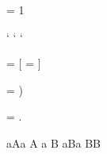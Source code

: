 \documentclass{article}
\makeatletter
\def\newXeTeXintercharclass{%
 \e@alloc\XeTeXcharclass
   \chardef\xe@alloc@intercharclass\m@ne\e@alloc@intercharclass@top}
\makeatother
\begin{document}
\XeTeXinterchartokenstate = 1

\newXeTeXintercharclass \mycharclassa
\newXeTeXintercharclass \mycharclassA
\newXeTeXintercharclass \mycharclassB

\XeTeXcharclass `\a \mycharclassa
\XeTeXcharclass `\A \mycharclassA
\XeTeXcharclass `\B \mycharclassB

\XeTeXinterchartoks \mycharclassa \mycharclassA = {[\itshape}
\XeTeXinterchartoks \mycharclassA \mycharclassa = {\upshape]}


\XeTeXinterchartoks {} = {)}

\XeTeXinterchartoks \mycharclassB \mycharclassB = {.}

aAa A a B aBa BB
\end{document}
